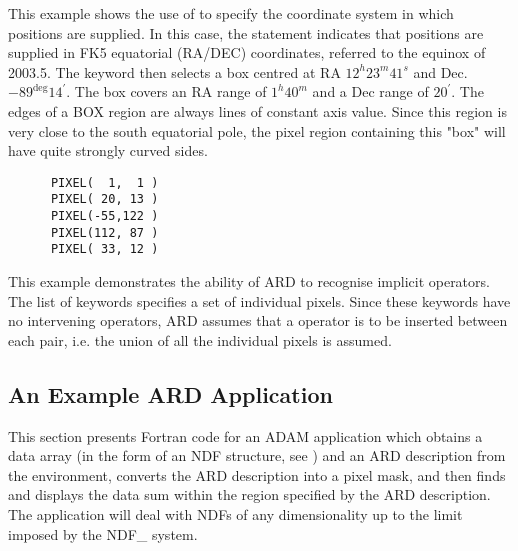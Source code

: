 This example shows the use of  to specify the
coordinate system in which positions are supplied. In this case, the
 statement indicates that positions are
supplied in FK5 equatorial (RA/DEC) coordinates, referred to the equinox
of 2003.5. The  keyword then selects a box centred
at RA $12^{h}23^{m}41^{s}$ and Dec. $-89^{\deg}14^{'}$. The box covers an
RA range of $1^{h}40^{m}$ and a Dec range of $20^{'}$. The edges of a BOX
region are always lines of constant axis value. Since this region is very
close to the south equatorial pole, the pixel region containing this
"box" will have quite strongly curved sides.

\small
\begin{verbatim}
      PIXEL(  1,  1 )
      PIXEL( 20, 13 )
      PIXEL(-55,122 )
      PIXEL(112, 87 )
      PIXEL( 33, 12 )
\end{verbatim}
\normalsize

This example demonstrates the ability of ARD to recognise implicit
 operators. The list of 
keywords specifies a set of individual pixels. Since these keywords have
no intervening operators, ARD assumes that a 
operator is to be inserted between each pair, i.e. the union of all the
individual pixels is assumed.

\subsection{\label{SEC:EXAMC}An Example ARD Application}

This section presents Fortran code for an ADAM application which obtains
a data array (in the form of an NDF structure, see ) 
and an ARD description from the environment, converts the ARD description
into a pixel mask, and then finds and displays the data sum within the
region specified by the ARD description. The application will deal with
NDFs of any dimensionality up to the limit imposed by the NDF\_ system.

